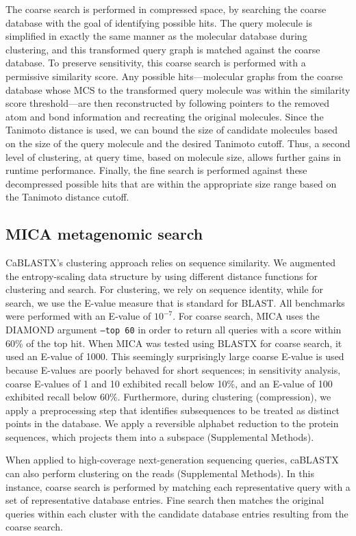 \documentclass[11pt]{elsarticle}
\theoremstyle{definition}
\theoremstyle{remark}
\numberwithin{equation}{section}
\begin{document}
The coarse search is performed in compressed space, by searching 
the coarse database with the goal of identifying possible hits.
The query molecule is simplified in exactly the same manner as 
the molecular database during clustering, and this transformed query graph is 
matched against the coarse database.
To preserve sensitivity, this coarse search is performed with a permissive 
similarity score.
Any possible hits---molecular graphs from the coarse database whose MCS to 
the transformed query molecule was within the similarity score threshold---are 
then reconstructed by following
pointers to the removed atom and bond information and recreating the 
original molecules.
Since the Tanimoto distance is used, we can bound the size of candidate 
molecules based on the size of the query molecule and the desired Tanimoto 
cutoff.
Thus, a second level of clustering, at query time, based on molecule size, 
allows further gains in runtime performance.
Finally, the fine search is performed against these decompressed possible 
hits that are within the appropriate size range based on the Tanimoto distance
cutoff.

\subsection{MICA metagenomic search}
CaBLASTX's clustering approach relies on sequence similarity.
We augmented the entropy-scaling data structure by using
different distance functions for clustering and search.
For clustering, we rely on sequence identity, while for search, we use the
E-value measure that is standard for BLAST.
All benchmarks were performed with an E-value of $10^{-7}$. For coarse search, MICA uses the DIAMOND argument \texttt{--top 60} in order to return all queries
with a score within 60\% of the top hit.
When MICA was tested using BLASTX for coarse search, it used an E-value of 
1000.
This seemingly surprisingly large coarse E-value is used because E-values are poorly behaved for short sequences; in sensitivity analysis, coarse E-values of 1 and 10 exhibited recall below 10\%, and an E-value of 100 exhibited recall below 60\%.
Furthermore, during clustering (compression), we apply a preprocessing step that
identifies subsequences to be treated as distinct points in the database.
We apply a reversible alphabet reduction to the
protein sequences, which projects them into a subspace (Supplemental Methods).

When applied to high-coverage next-generation sequencing queries, caBLASTX can also perform clustering on the reads (Supplemental Methods).
In this instance, coarse search is performed by matching each representative query with a set of representative database entries.
Fine search then matches the original queries within each cluster with the candidate database entries resulting from the coarse search.
\end{document}
